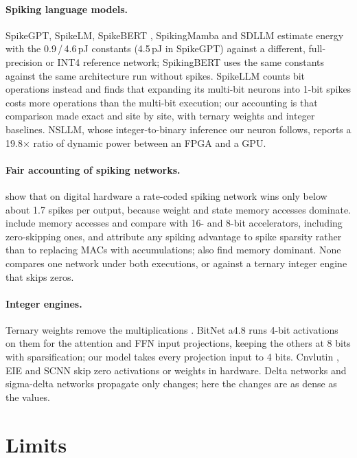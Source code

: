 \documentclass[11pt]{article}
\newcommand{\x}{$\times$}
\begin{document}
\paragraph{Spiking language models.} SpikeGPT, SpikeLM, SpikeBERT \citep{lv2023spikebert},
SpikingMamba and SDLLM estimate energy with the 0.9\,/\,4.6\,pJ constants (4.5\,pJ in SpikeGPT)
against a different, full-precision or INT4 reference network; SpikingBERT
\citep{bal2024spikingbert} uses the same constants against the same architecture run without
spikes. SpikeLLM counts bit operations instead and finds that expanding its multi-bit neurons
into 1-bit spikes costs more operations than the multi-bit execution; our accounting is that
comparison made exact and site by site, with ternary weights and integer baselines. NSLLM, whose
integer-to-binary inference our neuron follows, reports a 19.8\x{} ratio of dynamic power between
an FPGA and a GPU.

\paragraph{Fair accounting of spiking networks.} \citet{davidson2021} show that on digital
hardware a rate-coded spiking network wins only below about 1.7 spikes per output, because
weight and state memory accesses dominate. \citet{dampfhoffer2022} include memory accesses and
compare with 16- and 8-bit accelerators, including zero-skipping ones, and attribute any spiking
advantage to spike sparsity rather than to replacing MACs with accumulations;
\citet{lemaire2022} also find memory dominant. None compares one network under both executions,
or against a ternary integer engine that skips zeros.

\paragraph{Integer engines.} Ternary weights remove the multiplications \citep{ma2024era}.
BitNet a4.8 \citep{wang2024bitneta48} runs 4-bit activations on them for the attention and FFN
input projections, keeping the others at 8 bits with sparsification; our model takes every
projection input to 4 bits. Cnvlutin \citep{albericio2016cnvlutin}, EIE \citep{han2016eie} and
SCNN \citep{parashar2017scnn} skip zero activations or weights in hardware. Delta networks
\citep{neil2017delta} and sigma-delta networks \citep{oconnor2016sigmadelta} propagate only
changes; here the changes are as dense as the values.

\section{Limits}
\label{sec:limits}
\end{document}
